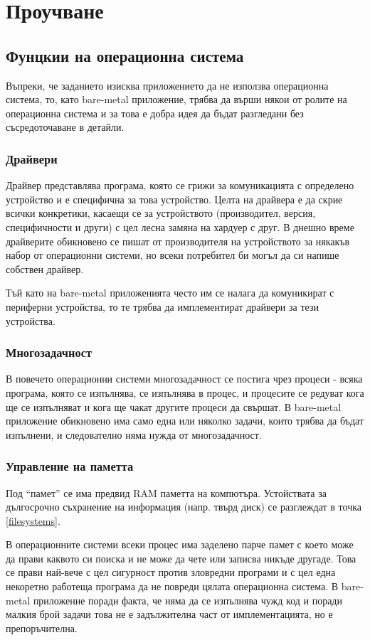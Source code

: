 \chapter{Проучване} %
\hfill
\section{Фунцкии на операционна система}
Въпреки, че заданието изисква приложението да не използва операционна система, то, като bare-metal приложение, трябва да върши някои от ролите на операционна система и за това е добра идея да бъдат разгледани без съсредоточаване в детайли.
  \subsection{Драйвери}
  Драйвер представлява програма, която се грижи за комуникацията с определено устройство и е специфична за това устройство. Целта на драйвера е да скрие всички конкретики, касаещи се за устройството (производител, версия, специфичности и други) с цел лесна замяна на хардуер с друг. В днешно време драйверите обикновено се пишат от производителя на устройството за някакъв набор от операционни системи, но всеки потребител би могъл да си напише собствен драйвер.

  Тъй като на bare-metal приложенията често им се налага да комуникират с периферни устройства, то те трябва да имплементират драйвери за тези устройства.

  \subsection{Многозадачност}
  В повечето операционни системи многозадачност се постига чрез процеси - всяка програма, която се изпълнява, се изпълнява в процес, и процесите се редуват кога ще се изпълняват и кога ще чакат другите процеси да свършат. В bare-metal приложение обикновено има само една или няколко задачи, които трябва да бъдат изпълнени, и следователно няма нужда от многозадачност.

  \subsection{Управление на паметта}
  Под ``памет'' се има предвид RAM паметта на компютъра. Устойствата за дългосрочно съхранение на информация (напр. твърд диск) се разглеждат в точка \ref{filesystems}.

  В операционните системи всеки процес има заделено парче памет с което може да прави каквото си поиска и не може да чете или записва никъде другаде. Това се прави най-вече с цел сигурност против зловредни програми и с цел една некоретно работеща програма да не повреди цялата операционна система. В bare-metal приложение поради факта, че няма да се изпълнява чужд код и поради малкия брой задачи това не е задължителна част от имплементацията, но е препоръчителна.

